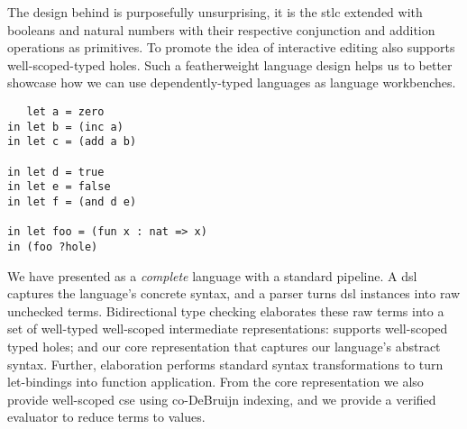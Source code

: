 

The design behind \Velo{} is purposefully unsurprising, it is the \ac{stlc} extended with booleans and natural numbers with their respective conjunction and addition operations as primitives.
To promote the idea of interactive editing \Velo{} also supports well-scoped-typed holes.
Such a featherweight language design helps us to better showcase how we can use dependently-typed languages as language workbenches.

\begin{verbatim}
   let a = zero
in let b = (inc a)
in let c = (add a b)

in let d = true
in let e = false
in let f = (and d e)

in let foo = (fun x : nat => x)
in (foo ?hole)

\end{verbatim}

We have presented \Velo{} as a \emph{complete} language with a standard pipeline.
A \ac{dsl} captures the language's concrete syntax, and a parser turns \ac{dsl} instances into raw unchecked terms.
Bidirectional type checking elaborates these raw terms into a set of well-typed well-scoped intermediate representations:  supports well-scoped typed holes; and  our core representation that captures our language's abstract syntax.
Further, elaboration performs standard syntax transformations to turn let-bindings into function application.
From the core representation we also provide well-scoped \ac{cse} using co-DeBruijn indexing, and we provide a verified evaluator to reduce terms to values.




